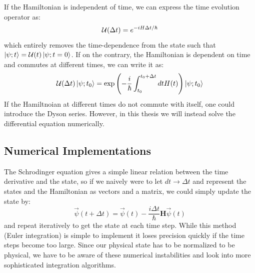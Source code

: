 If the Hamiltonian is independent of time, we can express the time evolution operator as:
\begin{equation}
    \mathcal{U}(\Delta t) = e^{-iH\Delta t/\hbar}
\end{equation}
which entirely removes the time-dependence from the state such that $\ket{\psi; t} = \mathcal{U}(t)\ket{\psi; t = 0}$.
If on the contrary, the Hamiltonian is dependent on time and commutes at different times, we can write it as:
\begin{equation}
    \mathcal{U}(\Delta t)\ket{\psi; t_0} = \exp\left(-\frac{i}{\hbar}\int_{t_0}^{t_0 + \Delta t} dt H(t)\right)\ket{\psi; t_0}
\end{equation}
If the Hamiltnoian at different times do not commute with itself, one could introduce the Dyson series\cite{sakurai_modern_2021}. However, in this thesis we will instead solve the differential equation numerically.

\subsection{Numerical Implementations}\label{sec:numerical_implementations}
The Schrodinger equation gives a simple linear relation between the time derivative and the state, so if we naively were to let $dt\to\Delta t$ and represent the states and the Hamiltonian as vectors and a matrix, we could simply update the state by:
\begin{equation}
    \Vec{\psi}(t + \Delta t) =  \Vec{\psi}(t) - \frac{i\Delta t}{\hbar}\boldsymbol{H} \Vec{\psi}(t)
\end{equation}
and repeat iteratively to get the state at each time step. While this method (Euler integration) is simple to implement it loses precision quickly if the time steps become too large. Since our physical state has to be normalized to be physical, we have to be aware of these numerical instabilities and look into more sophisticated integration algorithms.


